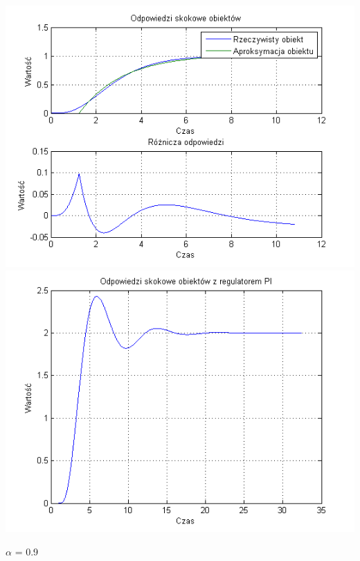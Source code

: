 \documentclass[10pt,a4paper]{article}
\begin{document}
\begin{center}
\includegraphics[scale=1]{images/jeden/skrypt_131.png}\\
\includegraphics[scale=1]{images/jeden/skrypt_132.png}\\
\end{center}
\newpage
$\alpha$ = 0.9
\end{document}
